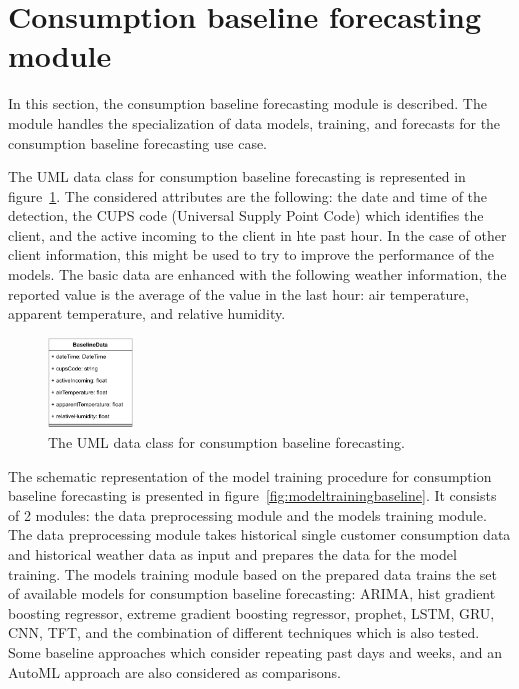 \section{Consumption baseline forecasting module}
\label{sec:baselinemodel}
\vspace{0.2 cm}

In this section, the consumption baseline forecasting module is described.
The module handles the specialization of data models, training, and forecasts for the consumption baseline forecasting use case.

The UML data class for consumption baseline forecasting is represented in figure~\ref{fig:umlbaseline}.
The considered attributes are the following: the date and time of the detection, the CUPS code (Universal Supply Point Code) which identifies the client, and the active incoming to the client in hte past hour.
In the case of other client information, this might be used to try to improve the performance of the models.
The basic data are enhanced with the following weather information, the reported value is the average of the value in the last hour: air temperature, apparent temperature, and relative humidity.

\begin{figure}[H]
\centering
\includegraphics[width=0.20\textwidth]{images/baseline_uml}
\caption{The UML data class for consumption baseline forecasting.}
\label{fig:umlbaseline}
\end{figure}

The schematic representation of the model training procedure for consumption baseline forecasting is presented in figure~\ref{fig:modeltrainingbaseline}.
It consists of 2 modules: the data preprocessing module and the models training module.
The data preprocessing module takes historical single customer consumption data and historical weather data as input and prepares the data for the model training.
The models training module based on the prepared data trains the set of available models for consumption baseline forecasting: ARIMA, hist gradient boosting regressor, extreme gradient boosting regressor, prophet, LSTM, GRU, CNN, TFT, and the combination of different techniques which is also tested.
Some baseline approaches which consider repeating past days and weeks, and an AutoML approach are also considered as comparisons.

